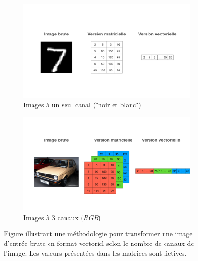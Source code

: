 \begin{figure}[h]
	\centering
	\begin{subfigure}{12cm}
		\centering
		\includegraphics[width=1\linewidth]{images/keynote/one-hot-transfo}
		\caption{Images à un seul canal ("noir et blanc")}
	\end{subfigure}
	\begin{subfigure}{12cm}
		\centering
		\includegraphics[width=1\linewidth]{images/keynote/one-hot-transfo-rgb}
		\caption{Images à 3 canaux (\textit{RGB})}
	\end{subfigure}
	\caption[Exemple de vectorisation d'une image.]{Figure illustrant une méthodologie pour transformer une image d'entrée brute en format vectoriel selon le nombre de canaux de l'image. Les valeurs présentées dans les matrices sont fictives.}
		\label{fig:one_hot}
\end{figure}


